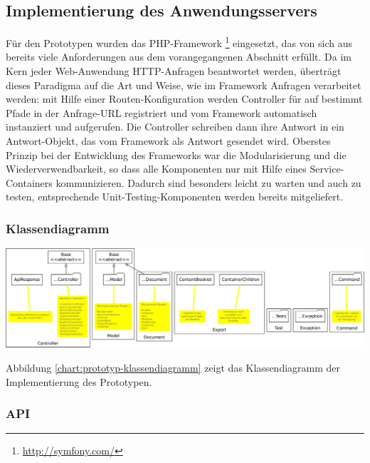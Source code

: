\subsection{Implementierung des Anwendungsservers}

Für den Prototypen wurden das PHP-Framework \footnote{\url{http://symfony.com/}} eingesetzt, das von sich aus bereits viele Anforderungen aus dem vorangegangenen Abschnitt erfüllt. Da im Kern jeder Web-Anwendung HTTP-Anfragen beantwortet werden, überträgt  dieses Paradigma auf die Art und Weise, wie im Framework Anfragen verarbeitet werden: mit Hilfe einer Routen-Konfiguration werden Controller für auf bestimmt Pfade in der Anfrage-URL registriert und vom Framework automatisch instanziert und aufgerufen. Die Controller schreiben dann ihre Antwort in ein Antwort-Objekt, das vom Framework als Antwort gesendet wird. Oberstes Prinzip bei der Entwicklung des Frameworks war die Modularisierung und die Wiederverwendbarkeit, so dass alle Komponenten nur mit Hilfe eines Service-Containers kommunizieren. Dadurch sind  besonders leicht zu warten und auch zu testen, entsprechende Unit-Testing-Komponenten werden bereits mitgeliefert.

\subsubsection{Klassendiagramm}

\begin{center}
\includegraphics[width=\textwidth]{media/prototyp-klassendiagramm.pdf}
\end{center}
\label{chart:prototyp-klassendiagramm}

\bigskip

Abbildung \ref{chart:prototyp-klassendiagramm} zeigt das Klassendiagramm der Implementierung des Prototypen.

\subsubsection{API}

